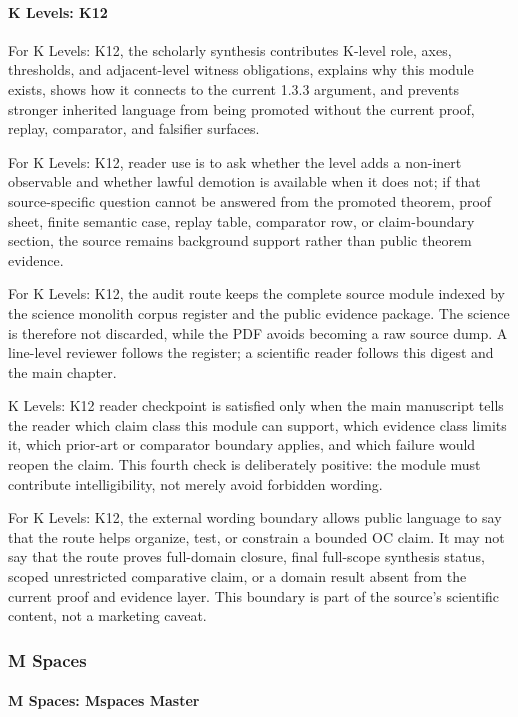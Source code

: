 \paragraph{K Levels: K12}

For K Levels: K12, the scholarly synthesis contributes K-level role, axes, thresholds, and adjacent-level witness obligations, explains why this module exists, shows how it connects to the current 1.3.3 argument, and prevents stronger inherited language from being promoted without the current proof, replay, comparator, and falsifier surfaces.


For K Levels: K12, reader use is to ask whether the level adds a non-inert observable and whether lawful demotion is available when it does not; if that source-specific question cannot be answered from the promoted theorem, proof sheet, finite semantic case, replay table, comparator row, or claim-boundary section, the source remains background support rather than public theorem evidence.


For K Levels: K12, the audit route keeps the complete source module indexed by the science monolith corpus register and the public evidence package. The science is therefore not discarded, while the PDF avoids becoming a raw source dump. A line-level reviewer follows the register; a scientific reader follows this digest and the main chapter.


K Levels: K12 reader checkpoint is satisfied only when the main manuscript tells the reader which claim class this module can support, which evidence class limits it, which prior-art or comparator boundary applies, and which failure would reopen the claim. This fourth check is deliberately positive: the module must contribute intelligibility, not merely avoid forbidden wording.


For K Levels: K12, the external wording boundary allows public language to say that the route helps organize, test, or constrain a bounded OC claim. It may not say that the route proves full-domain closure, final full-scope synthesis status, scoped unrestricted comparative claim, or a domain result absent from the current proof and evidence layer. This boundary is part of the source's scientific content, not a marketing caveat.


\subsubsection{M Spaces}

\paragraph{M Spaces: Mspaces Master}

